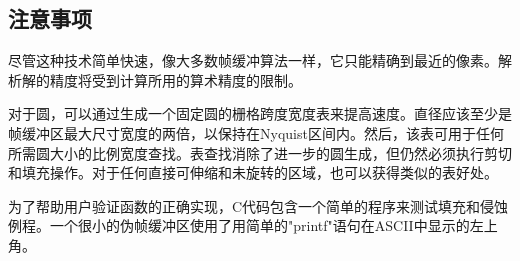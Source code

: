 \begin{CJK}{UTF8}{gbsn}
\subsection*{注意事项}
尽管这种技术简单快速，像大多数帧缓冲算法一样，它只能精确到最近的像素。解析解的精度将受到计算所用的算术精度的限制。


对于圆，可以通过生成一个固定圆的栅格跨度宽度表来提高速度。直径应该至少是帧缓冲区最大尺寸宽度的两倍，以保持在Nyquist区间内。然后，该表可用于任何所需圆大小的比例宽度查找。表查找消除了进一步的圆生成，但仍然必须执行剪切和填充操作。对于任何直接可伸缩和未旋转的区域，也可以获得类似的表好处。


为了帮助用户验证函数的正确实现，$\mathrm{C}$代码包含一个简单的程序来测试填充和侵蚀例程。一个很小的伪帧缓冲区使用了用简单的"printf"语句在ASCII中显示的左上角。











\end{CJK}
